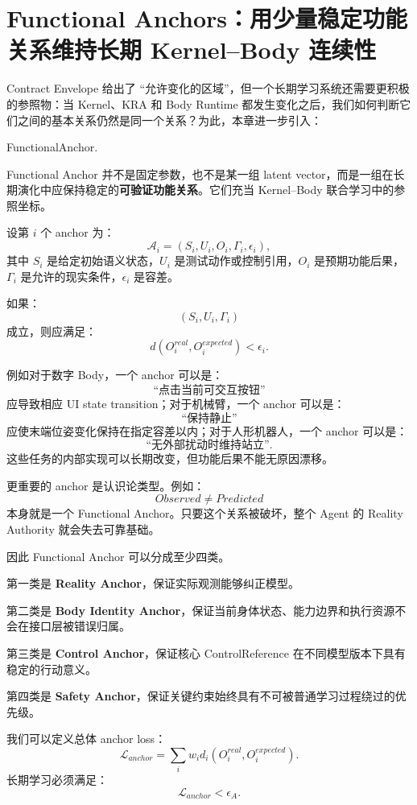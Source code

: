 \section{Functional Anchors：用少量稳定功能关系维持长期 Kernel--Body 连续性}

Contract Envelope 给出了 ``允许变化的区域''，但一个长期学习系统还需要更积极的参照物：当 Kernel、KRA 和 Body Runtime 都发生变化之后，我们如何判断它们之间的基本关系仍然是同一个关系？为此，本章进一步引入：
\begin{statementbox}
FunctionalAnchor.
\end{statementbox}

Functional Anchor 并不是固定参数，也不是某一组 latent vector，而是一组在长期演化中应保持稳定的\textbf{可验证功能关系}。它们充当 Kernel--Body 联合学习中的参照坐标。

设第 $i$ 个 anchor 为：
\[
\mathcal A_i
=
(
S_i,
U_i,
O_i,
\Gamma_i,
\epsilon_i
),
\]
其中 $S_i$ 是给定初始语义状态，$U_i$ 是测试动作或控制引用，$O_i$ 是预期功能后果，$\Gamma_i$ 是允许的现实条件，$\epsilon_i$ 是容差。

如果：
\[
(S_i,U_i,\Gamma_i)
\]
成立，则应满足：
\[
d(
O_i^{real},
O_i^{expected}
)
<
\epsilon_i.
\]

例如对于数字 Body，一个 anchor 可以是：
\[
\text{``点击当前可交互按钮''}
\]
应导致相应 UI state transition；对于机械臂，一个 anchor 可以是：
\[
\text{``保持静止''}
\]
应使末端位姿变化保持在指定容差以内；对于人形机器人，一个 anchor 可以是：
\[
\text{``无外部扰动时维持站立''}.
\]
这些任务的内部实现可以长期改变，但功能后果不能无原因漂移。

更重要的 anchor 是认识论类型。例如：
\[
Observed
\neq
Predicted
\]
本身就是一个 Functional Anchor。只要这个关系被破坏，整个 Agent 的 Reality Authority 就会失去可靠基础。

因此 Functional Anchor 可以分成至少四类。

第一类是 \textbf{Reality Anchor}，保证实际观测能够纠正模型。

第二类是 \textbf{Body Identity Anchor}，保证当前身体状态、能力边界和执行资源不会在接口层被错误归属。

第三类是 \textbf{Control Anchor}，保证核心 ControlReference 在不同模型版本下具有稳定的行动意义。

第四类是 \textbf{Safety Anchor}，保证关键约束始终具有不可被普通学习过程绕过的优先级。

我们可以定义总体 anchor loss：
\[
\mathcal L_{anchor}
=
\sum_i
w_i
d_i(
O_i^{real},
O_i^{expected}
).
\]
长期学习必须满足：
\[
\boxed{
\mathcal L_{anchor}
<
\epsilon_A.
}
\]

